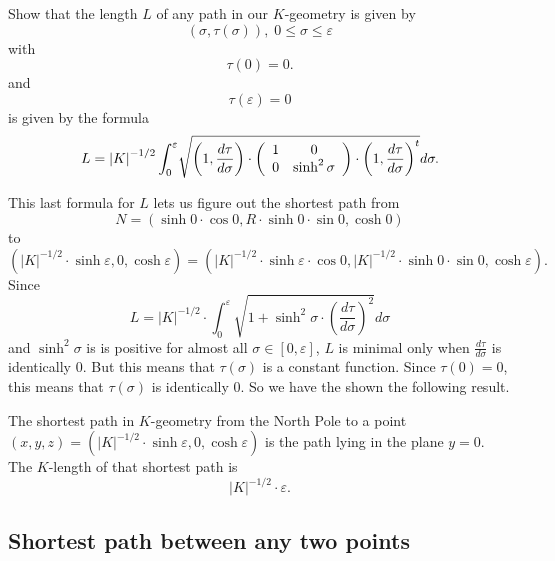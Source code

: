 \documentclass{ximera}
\begin{document}
\begin{exercise}
Show that the length $L$ of any path in our $K$-geometry is
given by%
\[
\left(  \sigma,\tau\left(  \sigma\right)  \right)  ,\;0\leq\sigma
\leq\varepsilon
\]
with%
\[
\tau\left(  0\right)  =0.
\]
and%
\[
\tau\left(  \varepsilon\right)  =0
\]
is given by the formula%
\[
L=\left\vert K\right\vert ^{-1/2}%
{\displaystyle\int\nolimits_{0}^{\varepsilon}}
\sqrt{\left(  1,\frac{d\tau}{d\sigma}\right)  \cdot\left(
\begin{array}
[c]{cc}%
1 & 0\\
0 & \sinh ^{2}\sigma
\end{array}
\right)  \cdot\left(  1,\frac{d\tau}{d\sigma}\right)  ^{t}}d\sigma.
\]

\end{exercise}

This last formula for $L$ lets us figure out the shortest path from 
\[
N=\left(\sinh 0\cdot \cos 0,R\cdot \sinh 0\cdot\sin 0,\cosh 0\right)
\]
to
\[
\left( \left\vert K\right\vert ^{-1/2}\cdot \sinh \varepsilon,0,\cosh
\varepsilon\right) =
\left( \left\vert K\right\vert ^{-1/2} \cdot
\sinh\varepsilon\cdot\cos 0,\left\vert K\right\vert
^{-1/2}\cdot\sinh 0\cdot \sin 0,\cosh  \varepsilon\right).
\]
Since%
\[
L=\left\vert K\right\vert ^{-1/2}\cdot %
{\displaystyle\int\nolimits_{0}^{\varepsilon}}
\sqrt{1+\sinh ^{2}\sigma\cdot \left(  \frac{d\tau
}{d\sigma}\right)  ^{2}}d\sigma
\]
and $\sinh ^{2}\sigma$ is is positive for almost all $\sigma\in\left[
0,\varepsilon\right]  $, $L$ is minimal only when $\frac{d\tau}{d\sigma}$ is
identically $0$. But this means that $\tau\left(  \sigma\right)  $ is a
constant function. Since $\tau\left(  0\right)  =0$, this means that
$\tau\left(  \sigma\right)  $ is identically $0$. So we have the shown the
following result.

\begin{theorem}
The shortest path in $K$-geometry from the North Pole to a point
$\left( x,y,z\right) =\left( \left\vert K\right\vert ^{-1/2} \cdot
\sinh \varepsilon,0,\cosh  \varepsilon\right) $ is the path lying in
the plane $y=0$. The $K$-length of that shortest path is%
\[
\left\vert K\right\vert ^{-1/2}\cdot \varepsilon.
\]

\end{theorem}

\subsection*{Shortest path between any two points}
\end{document}
